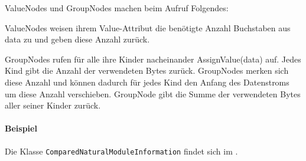 ValueNodes und GroupNodes machen beim Aufruf Folgendes:

ValueNodes weisen ihrem Value-Attribut die benötigte Anzahl Buchstaben aus data zu und geben diese Anzahl zurück.


GroupNodes rufen für alle ihre Kinder nacheinander AssignValue(data) auf. Jedes Kind gibt die Anzahl der verwendeten Bytes zurück. GroupNodes merken sich diese Anzahl und können dadurch für jedes Kind den Anfang des Datenstroms um diese Anzahl verschieben. GroupNode gibt die Summe der verwendeten Bytes aller seiner Kinder zurück.

\paragraph{Beispiel}
Die Klasse \texttt{Com\-par\-ed\-Na\-tu\-ral\-Mo\-dule\-In\-for\-ma\-tion} findet sich im .  







